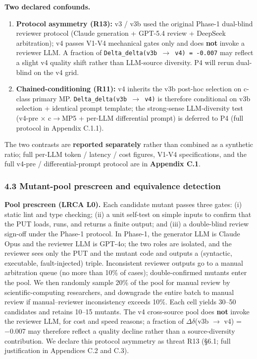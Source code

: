 \documentclass[review,12pt,authoryear]{elsarticle}
\begin{document}
\textbf{Two declared confounds.}

\begin{enumerate}
\def\labelenumi{\arabic{enumi}.}
\item
  \textbf{Protocol asymmetry (R13):} v3 / v3b used the original Phase-1
  dual-blind reviewer protocol (Claude generation + GPT-5.4 review +
  DeepSeek arbitration); v4 passes V1-V4 mechanical gates only and does
  \textbf{not} invoke a reviewer LLM. A fraction of
  \texttt{Delta\_delta(v3b\ $\to$\ v4)\ =\ -0.007} may reflect a slight v4
  quality shift rather than LLM-source diversity. P4 will rerun
  dual-blind on the v4 grid.
\item
  \textbf{Chained-conditioning (R11):} v4 inherits the v3b post-hoc
  selection on c-class primary MP. \texttt{Delta\_delta(v3b\ $\to$\ v4)} is
  therefore conditional on v3b selection + identical prompt template;
  the strong-sense LLM-diversity test (v4-pre $\times$ c$\to$MP5 + per-LLM
  differential prompt) is deferred to P4 (full protocol in Appendix
  C.1.1).
\end{enumerate}

The two contrasts are \textbf{reported separately} rather than combined
as a synthetic ratio; full per-LLM token / latency / cost figures, V1-V4
specifications, and the full v4-pre / differential-prompt protocol are
in \textbf{Appendix C.1}.

\subsubsection{4.3 Mutant-pool prescreen and equivalence
detection}\label{mutant-pool-prescreen-and-equivalence-detection}

\textbf{Pool prescreen (LRCA L0).} Each candidate mutant passes three
gates: (i) static lint and type checking; (ii) a unit self-test on
simple inputs to confirm that the PUT loads, runs, and returns a finite
output; and (iii) a double-blind review sign-off under the Phase-1
protocol. In Phase-1, the generator LLM is Claude Opus and the reviewer
LLM is GPT-4o; the two roles are isolated, and the reviewer sees only
the PUT and the mutant code and outputs a (syntactic, executable,
fault-injected) triple. Inconsistent reviewer outputs go to a manual
arbitration queue (no more than 10\% of cases); double-confirmed mutants
enter the pool. We then randomly sample 20\% of the pool for manual
review by scientific-computing researchers, and downgrade the entire
batch to manual review if manual--reviewer inconsistency exceeds 10\%.
Each cell yields 30--50 candidates and retains 10--15 mutants. The v4
cross-source pool does \textbf{not} invoke the reviewer LLM, for cost
and speed reasons; a fraction of $\Delta$$\delta$(v3b $\to$ v4) = −0.007 may therefore
reflect a quality decline rather than a source-diversity contribution.
We declare this protocol asymmetry as threat R13 (§6.1; full
justification in Appendices C.2 and C.3).
\end{document}
